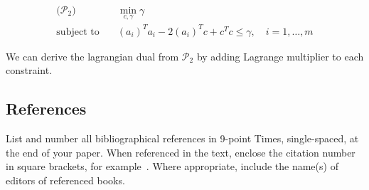 \documentclass[12pt,a4paper]{article}
\begin{document}
\begin{align*}
\text{($\mathcal{P}_2$)} \quad & \min_{c, \gamma} \gamma \\
\text{subject to} \quad & (a_i)^T a_i - 2(a_i)^T c + c^T c \leq \gamma, \quad i = 1, \ldots, m
\end{align*}

We can derive the lagrangian dual from $\mathcal{P}_2$ by adding Lagrange multiplier to each constraint.

\newpage
\subsection{References}

List and number all bibliographical references in 9-point Times,
single-spaced, at the end of your paper. When referenced in the text,
enclose the citation number in square brackets, for
example~\cite{Authors14}.  Where appropriate, include the name(s) of
editors of referenced books.


{\small


}
\end{document}
